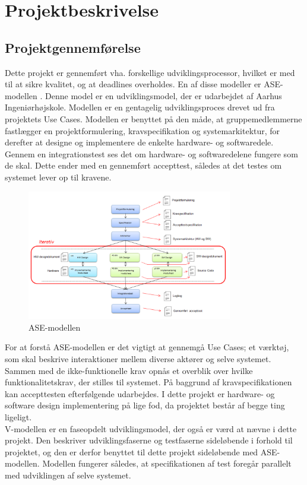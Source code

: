 \chapter{Projektbeskrivelse}
\section{Projektgennemførelse}
 
Dette projekt er gennemført vha. forskellige udviklingsprocessor, hvilket er med til at sikre kvalitet, og at deadlines overholdes. En af disse modeller er ASE-modellen \cite{ISE}. Denne model er en udviklingsmodel, der er udarbejdet af Aarhus Ingeniørhøjskole. Modellen er en gentagelig udviklingsproces drevet ud fra projektets Use Cases. Modellen er benyttet på den måde, at gruppemedlemmerne fastlægger en projektformulering, kravspecifikation og systemarkitektur, for derefter at designe og implementere de enkelte hardware- og softwaredele. Gennem en integrationstest ses det om hardware- og softwaredelene fungere som de skal.  
Dette ender med en gennemført accepttest, således at det testes om systemet lever op til kravene.
\begin{figure}[H]
	\centering
	\includegraphics[width=0.8\textwidth]{Figurer/AseModellen}
	\caption{ASE-modellen}
	\label{fig:ASE_model}
\end{figure}
For at forstå ASE-modellen \cite{ISE} er det vigtigt at gennemgå Use Cases; et værktøj, som skal beskrive interaktioner mellem diverse aktører og selve systemet. Sammen med de ikke-funktionelle krav opnås et overblik over hvilke funktionalitetskrav, der stilles til systemet. På baggrund af kravspecifikationen kan accepttesten efterfølgende udarbejdes. I dette projekt er hardware- og software design implementering på lige fod, da projektet består af begge ting ligeligt.\\
\newline
V-modellen \cite{ISE} er en faseopdelt udviklingsmodel, der også er værd at nævne i dette projekt. Den beskriver udviklingsfaserne og testfaserne sideløbende i forhold til projektet, og den er derfor benyttet til dette projekt sideløbende med ASE-modellen. Modellen fungerer således, at specifikationen af test foregår parallelt med udviklingen af selve systemet.

